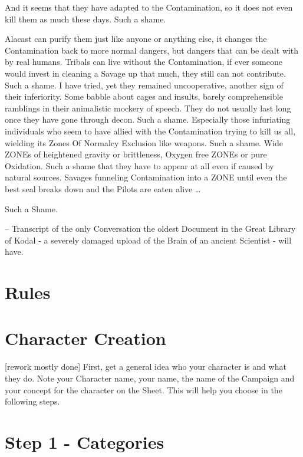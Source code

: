 \documentclass{book}
\begin{document}
    And it seems that they have adapted to the Contamination, so it does not even kill
    them as much these days.
    Such a shame. \par
    Alacast can purify them just like anyone or anything else,
    it changes the Contamination back to more normal dangers, but dangers that can be dealt with by real humans.
    Tribals can live without the Contamination,
    if ever someone would invest in cleaning a Savage up that much, they still can not contribute.
    Such a shame.
    I have tried, yet they remained uncooperative, another sign of their inferiority.
    Some babble about cages and insults, barely comprehensible ramblings in their animalistic mockery of
    speech.
    They do not usually last long once they have gone through decon.
    Such a shame.
    Especially those infuriating individuals who seem to have allied with the Contamination trying to kill us all,
    wielding its Zones Of Normalcy Exclusion like weapons.
    Such a shame.
    Wide ZONEs of heightened gravity or brittleness, Oxygen free ZONEs or pure Oxidation.
    Such a shame that they have to appear at all even if caused by natural sources.
    Savages funneling Contamination into a ZONE  until even the best seal breaks down and the Pilots are eaten alive
    \ldots \par Such a Shame. \par \vspace{1cm}
    -- Transcript of the only Conversation the oldest Document in the Great Library of Kodal - a severely damaged
    upload of the Brain of an ancient Scientist - will have.\newpage

    \section{Rules}\label{sec:rules}
    

    \section{Character Creation}
    [rework mostly done]\label{sec:characterCreation}
    First, get a general idea who your character is and what they do.
    Note your Character name, your name, the name of the
    Campaign and your concept for the character on the Sheet.
    This will help you choose in the following steps.

    \section{Step 1 - Categories}\label{sec:step1-categories}
\end{document}
